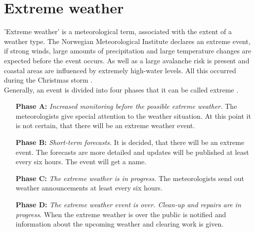 \section{Extreme weather}
'Extreme weather' is a meteorological term, associated with the extent of a weather type. The Norwegian Meteorological Institute declares an extreme event, if strong winds, large amounts of precipitation and large temperature changes are expected before the event occurs. As well as a large avalanche risk is present and coastal areas are influenced by extremely high-water levels. All this occurred during the Christmas storm \citep{olsen_ekstremvaerrapport._2017}.
\\
Generally, an event is divided into four phases that it can be called extreme \citep{pedersen_hva_2013}. 
\begin{itemize}
	\setlength\itemsep{-.85em}
	\item[\textbf{Phase A:}] \textit{Increased monitoring before the possible extreme weather.} The meteorologists give special attention to the weather situation. At this point it is not certain, that there will be an extreme weather event.
	\item[\textbf{Phase B:}] \textit{Short-term forecasts.} It is decided, that there will be an extreme event. The forecasts are more detailed and updates will be published at least every six hours. The event will get a name.
	\item[\textbf{Phase C:}] \textit{The extreme weather is in progress.} The meteorologists send out weather announcements at least every six hours.
	\item[\textbf{Phase D:}] \textit{The extreme weather event is over. Clean-up and repairs are in progress.} When the extreme weather is over the public is notified and information about the upcoming weather and clearing work is given.
\end{itemize}